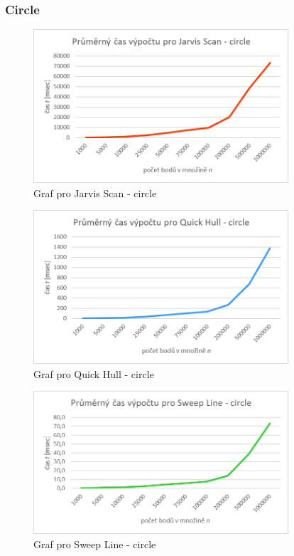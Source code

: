 \documentclass[a4paper, 12pt]{article}
\begin{document}
\subsubsection{Circle}
\begin{figure}[h!]
	\centering
	\includegraphics[width=9.5cm]{./pictures/g_circ_js.png}
	\caption{Graf pro Jarvis Scan - circle}
\end{figure}

\begin{figure}[h!]
	\centering
	\includegraphics[width=9.5cm]{./pictures/g_circ_qh.png}
	\caption{Graf pro Quick Hull - circle}
\end{figure}

\begin{figure}[h!]
	\centering
	\includegraphics[width=9.5cm]{./pictures/g_circ_sl.png}
	\caption{Graf pro Sweep Line - circle}
\end{figure}
\clearpage
\end{document}
